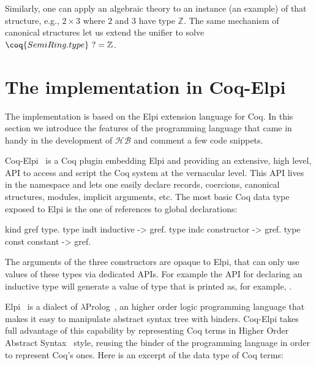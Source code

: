 \documentclass[a4paper,UKenglish,cleveref, autoref]{lipics-v2019}
\newcommand{\HB}{\ensuremath{\mathcal{HB}}}
\theoremstyle{implem}
\theoremstyle{implem}
\theoremstyle{command}
\theoremstyle{commands}
\begin{document}
Similarly, one can apply an algebraic theory to an instance (an example) of that structure, e.g., \(2 \times 3\) where \(2\) and \(3\) have type \(\mathbb{Z}\).
The same mechanism of canonical structures let us extend the unifier to solve \(\coq{SemiRing.type}~? = \mathbb{Z}\).


\section{The implementation in Coq-Elpi}\label{sec:implementation}

The implementation is based on the Elpi
extension language for Coq. In this section we introduce the features of the
programming language that came in handy in the development of \HB{} and
comment a few code snippets.

Coq-Elpi~\cite{CoqElpi} is a Coq plugin embedding
Elpi and providing an
extensive, high level, API to access and script the Coq system at the
vernacular level.
This API lives in the  namespace and lets one easily declare
records, coercions, canonical structures, modules, implicit arguments, etc.
The most basic Coq data type exposed to Elpi is the one of references to global
declarations:

\begin{elpicode}
kind gref  type.                 %
type indt  inductive -> gref.    %
type indc  constructor -> gref.  %
type const constant -> gref.     %
\end{elpicode}

The arguments of the three constructors are opaque to Elpi, that can only use
values of these types via dedicated APIs. For example the API for declaring
an inductive type will generate a value of type  that
is printed as, for example, .

Elpi~\cite{DBLP:conf/lpar/DunchevGCT15} is a dialect
of $\lambda$Prolog~\cite{Miller:2012:PHL:2331097}, an higher order
logic programming language that makes it easy to manipulate abstract syntax
tree with binders. Coq-Elpi takes full advantage of this capability by
representing Coq terms in Higher Order Abstract
Syntax~\cite{10.1145/53990.54010} style, reusing the binder of the programming
language in order to represent Coq's ones. Here is an excerpt of the data
type of Coq terms:
\end{document}
